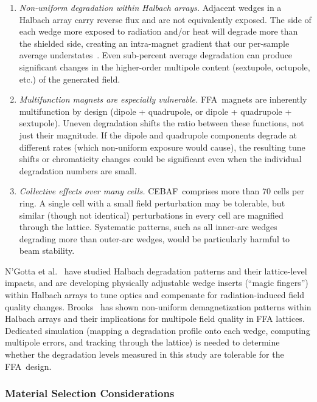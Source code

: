\documentclass[11pt,letterpaper]{article}
\newcommand{\CEBAF}{CEBAF}
\newcommand{\FFA}{FFA}
\begin{document}
\begin{enumerate}
    \item \emph{Non-uniform degradation within Halbach arrays.}
    Adjacent wedges in a Halbach array carry reverse flux and are not
    equivalently exposed. The side of each wedge more exposed to radiation
    and/or heat will degrade more than the shielded side, creating an
    intra-magnet gradient that our per-sample average
    understates~\cite{NGotta2024,Brooks2017}. Even sub-percent average
    degradation can produce significant changes in the higher-order
    multipole content (sextupole, octupole, etc.) of the generated field.

    \item \emph{Multifunction magnets are especially vulnerable.}
    \FFA~magnets are inherently multifunction by design (dipole + quadrupole,
    or dipole + quadrupole + sextupole). Uneven degradation shifts the
    ratio between these functions, not just their magnitude. If the
    dipole and quadrupole components degrade at different rates (which
    non-uniform exposure would cause), the resulting tune shifts or
    chromaticity changes could be significant even when the individual
    degradation numbers are small.

    \item \emph{Collective effects over many cells.}
    \FFA@\CEBAF~comprises more than 70 cells per ring. A single cell with a
    small field perturbation may be tolerable, but similar (though not
    identical) perturbations in every cell are magnified through the lattice.
    Systematic patterns, such as all inner-arc wedges degrading more than
    outer-arc wedges, would be particularly harmful to beam stability.
\end{enumerate}

N'Gotta et al.~\cite{NGotta2024} have studied Halbach degradation patterns
and their lattice-level impacts, and are developing physically adjustable
wedge inserts (``magic fingers'') within Halbach arrays to tune optics and
compensate for radiation-induced field quality changes. Brooks~\cite{Brooks2017}
has shown non-uniform demagnetization patterns within Halbach arrays and
their implications for multipole field quality in FFA lattices. Dedicated
simulation (mapping a degradation profile onto each wedge, computing
multipole errors, and tracking through the lattice) is needed to determine
whether the degradation levels measured in this study are tolerable for the
\FFA~design.

\subsubsection{Material Selection Considerations}
\end{document}
